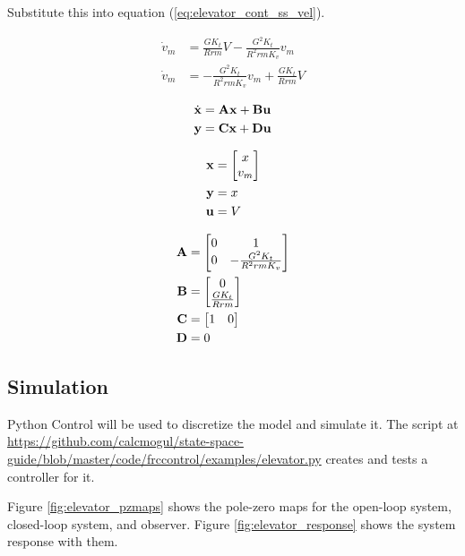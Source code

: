Substitute this into equation (\ref{eq:elevator_cont_ss_vel}).

\begin{align}
  \dot{v}_m &= \frac{GK_t}{Rrm} V - \frac{G^2 K_t}{R^2 rm K_v} v_m \nonumber \\
  \dot{v}_m &= -\frac{G^2 K_t}{R^2 rm K_v} v_m + \frac{GK_t}{Rrm} V
\end{align}

\begin{align*}
  \dot{\mathbf{x}} &= \mathbf{A} \mathbf{x} + \mathbf{B} \mathbf{u} \\
  \mathbf{y} &= \mathbf{C} \mathbf{x} + \mathbf{D} \mathbf{u}
\end{align*}

\begin{align*}
  \mathbf{x} &=
  \begin{bmatrix}
    x \\
    v_m
  \end{bmatrix} \\
  \mathbf{y} &= x \\
  \mathbf{u} &= V
\end{align*}

\begin{align}
  \mathbf{A} &=
  \begin{bmatrix}
    0 & 1 \\
    0 & -\frac{G^2 K_t}{R^2rmK_v}
  \end{bmatrix} \\
  \mathbf{B} &=
  \begin{bmatrix}
    0 \\
    \frac{GK_t}{Rrm}
  \end{bmatrix} \\
  \mathbf{C} &=
  \begin{bmatrix}
    1 & 0
  \end{bmatrix} \\
  \mathbf{D} &= 0
\end{align}

\subsection{Simulation}

Python Control will be used to discretize the model and simulate it. The script
at
\url{https://github.com/calcmogul/state-space-guide/blob/master/code/frccontrol/examples/elevator.py}
creates and tests a controller for it.

Figure \ref{fig:elevator_pzmaps} shows the pole-zero maps for the open-loop
system, closed-loop system, and observer. Figure \ref{fig:elevator_response}
shows the system response with them.

